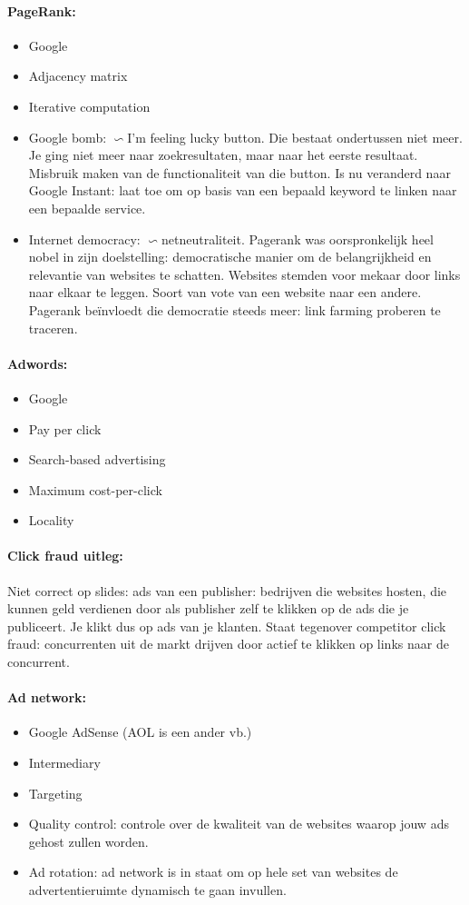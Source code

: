 \documentclass[10pt,a4paper]{report}
\begin{document}
\paragraph{PageRank:}
\begin{itemize}
\item Google
\item Adjacency matrix
\item Iterative computation
\item Google bomb: $\backsim$I'm feeling lucky button. Die bestaat ondertussen niet meer. Je ging niet meer naar zoekresultaten, maar naar het eerste resultaat. Misbruik maken van de functionaliteit van die button. Is nu veranderd naar Google Instant: laat toe om op basis van een bepaald keyword te linken naar een bepaalde service.
\item Internet democracy: $\backsim$netneutraliteit. Pagerank was oorspronkelijk heel nobel in zijn doelstelling: democratische manier om de belangrijkheid en relevantie van websites te schatten. Websites stemden voor mekaar door links naar elkaar te leggen. Soort van vote van een website naar een andere. Pagerank beïnvloedt die democratie steeds meer: link farming proberen te traceren.
\end{itemize}

\paragraph{Adwords:}
\begin{itemize}
\item Google
\item Pay per click
\item Search-based advertising
\item Maximum cost-per-click
\item Locality
\end{itemize}

\paragraph{Click fraud uitleg:}Niet correct op slides: ads van een publisher: bedrijven die websites hosten, die kunnen geld verdienen door als publisher zelf te klikken op de ads die je publiceert. Je klikt dus op ads van je klanten.
Staat tegenover competitor click fraud: concurrenten uit de markt drijven door actief te klikken op links naar de concurrent.

\paragraph{Ad network:}
\begin{itemize}
\item Google AdSense (AOL is een ander vb.)
\item Intermediary
\item Targeting
\item Quality control: controle over de kwaliteit van de websites waarop jouw ads gehost zullen worden.
\item Ad rotation: ad network is in staat om op hele set van websites de advertentieruimte dynamisch te gaan invullen.
\end{itemize}
\end{document}
